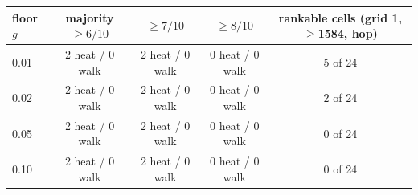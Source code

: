 \begin{tabular}{@{}lcccc@{}}
\toprule
floor $g$ & majority $\geq 6/10$ & $\geq 7/10$ & $\geq 8/10$ & rankable cells (grid 1, $\geq$1584, hop) \\
\midrule
0.01 & 2 heat / 0 walk & 2 heat / 0 walk & 0 heat / 0 walk & 5 of 24 \\
0.02 & 2 heat / 0 walk & 2 heat / 0 walk & 0 heat / 0 walk & 2 of 24 \\
0.05 & 2 heat / 0 walk & 2 heat / 0 walk & 0 heat / 0 walk & 0 of 24 \\
0.10 & 2 heat / 0 walk & 2 heat / 0 walk & 0 heat / 0 walk & 0 of 24 \\
\bottomrule
\end{tabular}
